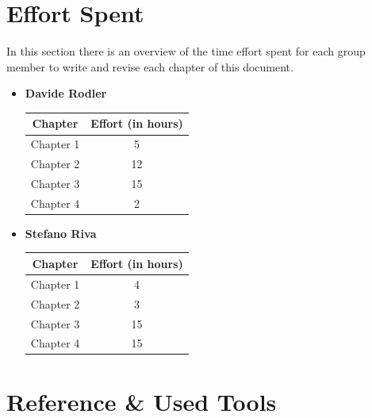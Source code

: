 \documentclass[12pt]{article}
\numberwithin{figure}{section}
\numberwithin{table}{section}
\begin{document}
\section{Effort Spent}
In this section there is an overview of the time effort spent for each group member to write and revise each chapter of this document.
    \begin{itemize}
        \item \textbf{Davide Rodler}
            \begin{table}[H]
                \centering
                \begin{tabular}{|c|c|}
                    \hline
                    \textbf{Chapter} & \textbf{Effort (in hours)} \\
                    \hline
                    Chapter 1 &  5\\
                    \hline
                    Chapter 2 &  12\\
                    \hline
                    Chapter 3 &  15\\
                    \hline
                    Chapter 4 &  2\\
                    \hline
                \end{tabular}
            \end{table} 
      
        \item \textbf{Stefano Riva}
            \begin{table}[H]
                \centering
                \begin{tabular}{|c|c|}
                    \hline
                    \textbf{Chapter} & \textbf{Effort (in hours)} \\
                    \hline
                    Chapter 1 &  4\\
                    \hline
                    Chapter 2 &  3\\
                    \hline
                    Chapter 3 &  15\\
                    \hline
                    Chapter 4 &  15\\
                    \hline
                \end{tabular}
            \end{table}
    \end{itemize}

\section{Reference \& Used Tools}
\end{document}
